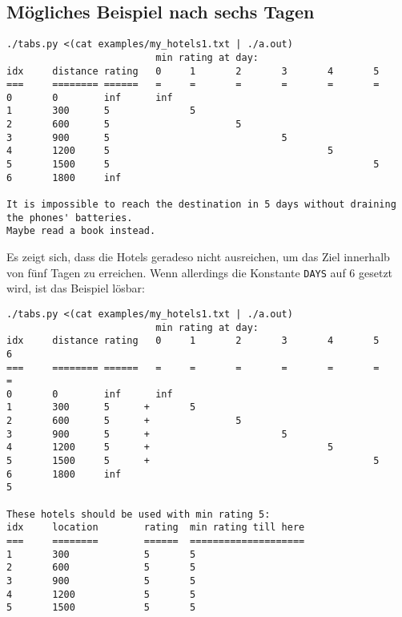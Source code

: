 \documentclass[a4paper,10pt,ngerman]{scrartcl}
\begin{document}
\subsection*{Mögliches Beispiel nach sechs Tagen}
\begin{lstlisting}
./tabs.py <(cat examples/my_hotels1.txt | ./a.out)
                          min rating at day:
idx     distance rating   0     1       2       3       4       5
===     ======== ======   =     =       =       =       =       =
0       0        inf      inf
1       300      5              5
2       600      5                      5
3       900      5                              5
4       1200     5                                      5
5       1500     5                                              5
6       1800     inf

It is impossible to reach the destination in 5 days without draining the phones' batteries.
Maybe read a book instead.
\end{lstlisting}
Es zeigt sich, dass die Hotels geradeso nicht ausreichen, um das Ziel innerhalb von fünf Tagen zu erreichen.
Wenn allerdings die Konstante \lstinline{DAYS} auf $6$ gesetzt wird, ist das Beispiel lösbar:
\begin{lstlisting}
./tabs.py <(cat examples/my_hotels1.txt | ./a.out)
                          min rating at day:
idx     distance rating   0     1       2       3       4       5       6
===     ======== ======   =     =       =       =       =       =       =
0       0        inf      inf
1       300      5      +       5
2       600      5      +               5
3       900      5      +                       5
4       1200     5      +                               5
5       1500     5      +                                       5
6       1800     inf                                                    5

These hotels should be used with min rating 5:
idx     location        rating  min rating till here
===     ========        ======  ====================
1       300             5       5
2       600             5       5
3       900             5       5
4       1200            5       5
5       1500            5       5
\end{lstlisting}
\end{document}
